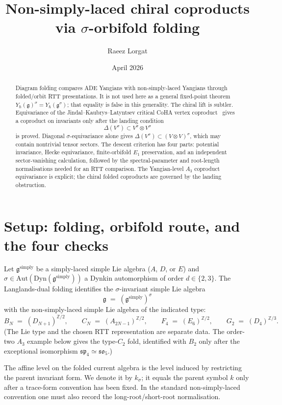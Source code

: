 \documentclass[11pt]{amsart}
\title{Non-simply-laced chiral coproducts via $\sigma$-orbifold folding}
\author{Raeez Lorgat}
\date{April 2026}
\theoremstyle{definition}
\theoremstyle{remark}
\providecommand{\fg}{\mathfrak{g}}
\providecommand{\fso}{\mathfrak{so}}
\providecommand{\fsp}{\mathfrak{sp}}
\renewcommand{\hbar}{\hslash}
\begin{document}
\maketitle

\begin{abstract}
Diagram folding compares ADE Yangians with non-simply-laced Yangians
through folded/orbit RTT presentations. It is not used here as a
general fixed-point theorem
$Y_\hbar(\fg)^\sigma=Y_\hbar(\fg^\sigma)$; that equality is false in
this generality. The chiral lift is subtler. Equivariance of the
Jindal--Kaubrys--Latyntsev critical CoHA vertex coproduct~\cite{JKL}
gives a coproduct on invariants only after the landing condition
\[
  \Delta(V^\sigma) \subset V^\sigma \otimes V^\sigma
\]
is proved. Diagonal $\sigma$-equivariance alone gives
$\Delta(V^\sigma)\subset (V\otimes V)^\sigma$, which may contain
nontrivial tensor sectors. The descent criterion has four parts:
potential invariance, Hecke equivariance, finite-orbifold $E_1$
preservation, and an independent sector-vanishing calculation, followed
by the spectral-parameter and root-length normalisations needed for an
RTT comparison. The Yangian-level $A_3$ coproduct equivariance is
explicit; the chiral folded coproducts are governed by the landing
obstruction.
\end{abstract}

\section{Setup: folding, orbifold route, and the four checks}
\label{sec:setup-folding}

Let $\fg^{\mathrm{simply}}$ be a simply-laced simple Lie algebra
($A$, $D$, or $E$) and $\sigma \in \mathrm{Aut}(\mathrm{Dyn}(\fg^{\mathrm{simply}}))$
a Dynkin automorphism of order $d \in \{2, 3\}$. The Langlands-dual
folding identifies the $\sigma$-invariant simple Lie algebra
\[
  \fg \;=\; (\fg^{\mathrm{simply}})^{\sigma}
\]
with the non-simply-laced simple Lie algebra of the indicated type:
\[
  B_N \;=\; (D_{N+1})^{\mathbb{Z}/2}, \qquad
  C_N \;=\; (A_{2N-1})^{\mathbb{Z}/2}, \qquad
  F_4 \;=\; (E_6)^{\mathbb{Z}/2}, \qquad
  G_2 \;=\; (D_4)^{\mathbb{Z}/3}.
\]
(The Lie type and the chosen RTT representation are separate data.
The order-two $A_3$ example below gives the type-$C_2$ fold, identified
with $B_2$ only after the exceptional isomorphism
$\fsp_4\simeq\fso_5$.)

The affine level on the folded current algebra is the level induced by
restricting the parent invariant form. We denote it by $k_\sigma$; it
equals the parent symbol $k$ only after a trace-form convention has
been fixed. In the standard non-simply-laced convention one must also
record the long-root/short-root normalisation.
\end{document}
